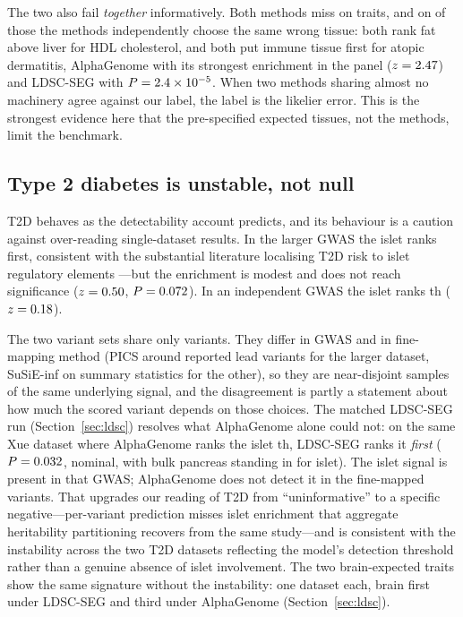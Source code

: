 \documentclass[11pt]{article}
\begin{document}
The two also fail \emph{together} informatively. Both methods miss on \NBOTHMISS{} traits, and on
\NSAMEWRONG{} of those the methods independently choose the same wrong tissue: both rank
fat above liver for HDL cholesterol, and both put immune tissue first for atopic
dermatitis, AlphaGenome with its strongest enrichment in the panel ($z = 2.47$) and
LDSC-SEG with $P = 2.4\times 10^{-5}$. When two methods sharing almost no machinery agree against
our label, the label is the likelier error. This is the strongest evidence here
that the pre-specified expected tissues, not the methods, limit the benchmark.



\subsection{Type 2 diabetes is unstable, not null}\label{sec:t2d}

T2D behaves as the detectability account predicts, and its behaviour is a caution
against over-reading single-dataset results. In the larger GWAS
\citep{mahajan2018finemap} the islet ranks first, consistent with the substantial
literature localising T2D risk to islet regulatory elements
\citep{gaulton2010islet, pasquali2014enhancer, greenwald2019islet, chiou2021islet}---but
the enrichment is modest and does not reach significance ($z = 0.50$, $P = 0.072$). In an
independent GWAS \citep{xue2018t2d} the islet ranks \TDXRANK{}th ($z = 0.18$).

The two variant sets share only \OVERLAP{} variants. They differ in GWAS and in
fine-mapping method (PICS around reported lead variants for the larger dataset, SuSiE-inf
on summary statistics for the other), so they are near-disjoint samples of the same
underlying signal, and the disagreement is partly a statement about how much the scored
variant depends on those choices. The matched LDSC-SEG run (Section~\ref{sec:ldsc})
resolves what AlphaGenome alone could not: on the same Xue dataset where AlphaGenome ranks
the islet \TWODAGRANK{}th, LDSC-SEG ranks it \emph{first} ($P = 0.032$, nominal, with
bulk pancreas standing in for islet). The islet signal is present in that GWAS; AlphaGenome
does not detect it in the fine-mapped variants. That upgrades our reading of T2D from
``uninformative'' to a specific negative---per-variant prediction misses islet enrichment
that aggregate heritability partitioning recovers from the same study---and is consistent
with the instability across the two T2D datasets reflecting the model's detection
threshold rather than a genuine absence of islet involvement. The two brain-expected
traits show the same signature without the instability: one dataset each, brain first
under LDSC-SEG and third under AlphaGenome (Section~\ref{sec:ldsc}).
\end{document}
